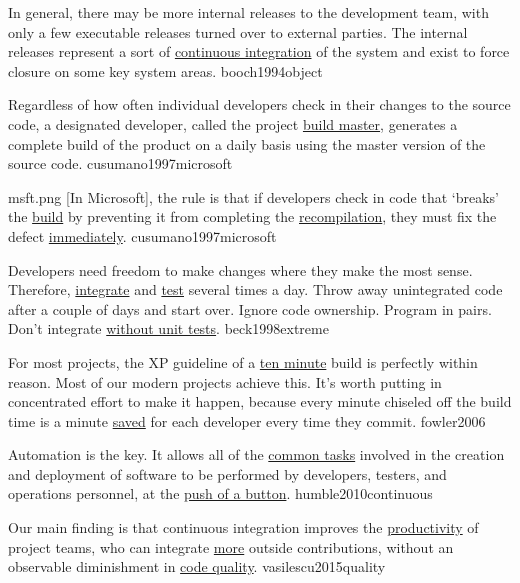 \documentclass{article}
\begin{document}

  {In general, there may be more internal releases to the development team, with only a few executable releases turned over to external parties. The internal releases represent a sort of \ul{continuous integration} of the system and exist to force closure on some key system areas.}
  {booch1994object}

  {Regardless of how often individual developers check in their changes to the source code, a designated developer, called the project \ul{build master}, generates a complete build of the product on a daily basis using the master version of the source code.}
  {cusumano1997microsoft}

\qte
  {msft.png}
  {[In Microsoft], the rule is that if developers check in code that `breaks' the \ul{build} by preventing it from completing the \ul{recompilation}, they must fix the defect \ul{immediately}.}
  {cusumano1997microsoft}

  {Developers need freedom to make changes where they make the most sense. Therefore, \ul{integrate} and \ul{test} several times a day. Throw away unintegrated code after a couple of days and start over. Ignore code ownership. Program in pairs. Don't integrate \ul{without unit tests}.}
  {beck1998extreme}

  {For most projects, the XP guideline of a \ul{ten minute} build is perfectly within reason. Most of our modern projects achieve this. It's worth putting in concentrated effort to make it happen, because every minute chiseled off the build time is a minute \ul{saved} for each developer every time they commit.}
  {fowler2006}

  {Automation is the key. It allows all of the \ul{common tasks} involved in the creation and deployment of software to be performed by developers, testers, and operations personnel, at the \ul{push of a button}.}
  {humble2010continuous}

  {Our main finding is that continuous integration improves the \ul{productivity} of project teams, who can integrate \ul{more} outside contributions, without an observable diminishment in \ul{code quality}.}
  {vasilescu2015quality}
\end{document}
